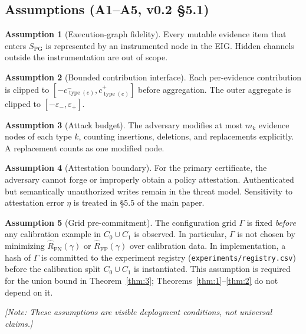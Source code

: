\documentclass[11pt]{article}
\newcommand{\NOTE}[1]{{\color{blue}\textit{[Note: #1]}}}
\theoremstyle{plain}
\theoremstyle{definition}
\newtheorem{assumption}{Assumption}
\DeclareMathOperator{\type}{type}
\begin{document}
\subsection{Assumptions (A1--A5, v0.2 \S 5.1)}

\begin{assumption}[Execution-graph fidelity]\label{a1}
Every mutable evidence item that enters $S_{\mathrm{PG}}$ is represented by an
instrumented node in the EIG. Hidden channels outside the instrumentation are out of scope.
\end{assumption}

\begin{assumption}[Bounded contribution interface]\label{a2}
Each per-evidence contribution is clipped to $[-c_{\type(e)}^-, c_{\type(e)}^+]$ before aggregation.
The outer aggregate is clipped to $[-\varepsilon_-, \varepsilon_+]$.
\end{assumption}

\begin{assumption}[Attack budget]\label{a3}
The adversary modifies at most $m_k$ evidence nodes of each type $k$, counting insertions, deletions, and
replacements explicitly. A replacement counts as one modified node.
\end{assumption}

\begin{assumption}[Attestation boundary]\label{a4}
For the primary certificate, the adversary cannot forge or improperly obtain a policy attestation.
Authenticated but semantically unauthorized writes remain in the threat model.
Sensitivity to attestation error $\eta$ is treated in \S 5.5 of the main paper.
\end{assumption}

\begin{assumption}[Grid pre-commitment]\label{a5}
The configuration grid $\Gamma$ is fixed \emph{before} any calibration example
in $C_0 \cup C_1$ is observed. In particular, $\Gamma$ is not chosen by minimizing
$\widehat R_{\mathrm{FN}}(\gamma)$ or $\widehat R_{\mathrm{FP}}(\gamma)$ over calibration data.
In implementation, a hash of $\Gamma$ is committed to the experiment registry
(\texttt{experiments/registry.csv}) before the calibration split $C_0 \cup C_1$ is instantiated.
This assumption is required for the union bound in Theorem~\ref{thm:3};
Theorems~\ref{thm:1}--\ref{thm:2} do not depend on it.
\end{assumption}

\NOTE{These assumptions are visible deployment conditions, not universal claims.}
\end{document}

